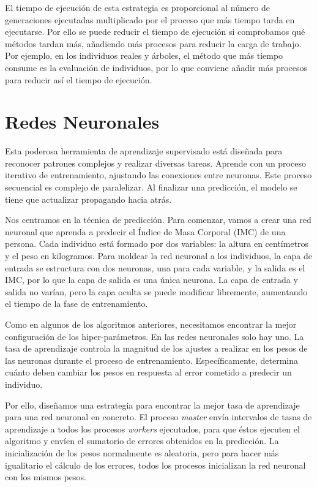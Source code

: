 	El tiempo de ejecución de esta estrategia es proporcional al número de generaciones ejecutadas multiplicado por el proceso que más tiempo tarda en ejecutarse. Por ello se puede reducir el tiempo de ejecución si comprobamos qué métodos tardan más, añadiendo más procesos para reducir la carga de trabajo. Por ejemplo, en los individuos reales y árboles, el método que más tiempo consume es la evaluación de individuos, por lo que conviene añadir más procesos para reducir así el tiempo de ejecución.
	
	
	
	

\section{Redes Neuronales}
\label{cap:3_5}
	Esta poderosa herramienta de aprendizaje supervisado está diseñada para reconocer patrones complejos y realizar diversas tareas. Aprende con un proceso iterativo de entrenamiento, ajustando las conexiones entre neuronas. Este proceso secuencial es complejo de paralelizar. Al finalizar una predicción, el modelo se tiene que actualizar propagando hacia atrás.
	
	Nos centramos en la técnica de predicción. Para comenzar, vamos a crear una red neuronal que aprenda a predecir el Índice de Masa Corporal (IMC) de una persona. Cada individuo está formado por dos variables: la altura en centímetros y el peso en kilogramos. Para moldear la red neuronal a los individuos, la capa de entrada se estructura con dos neuronas, una para cada variable, y la salida es el IMC, por lo que la capa de salida es una única neurona. La capa de entrada y salida no varían, pero la capa oculta se puede modificar libremente, aumentando el tiempo de la fase de entrenamiento.
	
	
	Como en algunos de los algoritmos anteriores, necesitamos encontrar la mejor configuración de los hiper-parámetros. En las redes neuronales solo hay uno. La tasa de aprendizaje controla la magnitud de los ajustes a realizar en los pesos de las neuronas durante el proceso de entrenamiento. Específicamente, determina cuánto deben cambiar los pesos en respuesta al error cometido a predecir un individuo.
	
	
	Por ello, diseñamos una estrategia para encontrar la mejor tasa de aprendizaje para una red neuronal en concreto. El proceso \textit{master} envía intervalos de tasas de aprendizaje a todos los procesos \textit{workers} ejecutados, para que éstos ejecuten el algoritmo y envíen el sumatorio de errores obtenidos en la predicción. La inicialización de los pesos normalmente es aleatoria, pero para hacer más igualitario el cálculo de los errores, todos los procesos inicializan la red neuronal con los mismos pesos.
	
